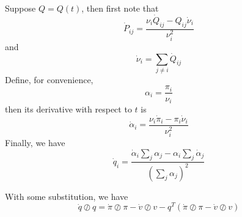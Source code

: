	Suppose $Q = Q(t)$, then first note that
	\[
		\dot P_{ij} = \frac{\nu_i \dot Q_{ij} - Q_{ij} \dot \nu_i}{\nu_i^2}
	\]
	and
	\[
		\dot \nu_i = \sum_{j \ne i} \dot Q_{ij}
	\]
	Define, for convenience,
	\[
		\alpha_i = \frac{\pi_i}{\nu_i}
	\]
	then its derivative with respect to $t$ is
	\[
		\dot \alpha_i = \frac{\nu_i \dot \pi_i - \pi_i \dot \nu_i}{\nu_i^2}
	\]
	Finally, we have
	\[
		\dot q_i =
		\frac { \dot \alpha_i \sum_{j} \alpha_j - \alpha_i \sum_{j} \dot \alpha_j }
				{ \left( \sum_{j} \alpha_j \right)^2 }
	\]


	With some substitution, we have
	\[
	\dot q \oslash  q = \dot \pi \oslash \pi - \dot v \oslash v - q^T(\dot \pi \oslash \pi - \dot v \oslash v)
	\]
    
    


